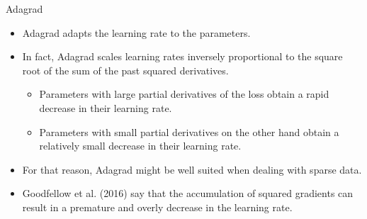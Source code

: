 \documentclass[11pt,compress,t,notes=noshow, xcolor=table]{beamer}
\begin{document}
\begin{vbframe}{Adagrad}
	\begin{itemize}
		\item Adagrad adapts the learning rate to the parameters.
		\item In fact, Adagrad scales learning rates inversely proportional to the square root of the sum of the past squared derivatives.
		\begin{itemize}
			\item Parameters with large partial derivatives of the loss obtain a rapid decrease in their learning rate.
			\item Parameters with small partial derivatives on the other hand obtain a relatively small decrease in their learning rate.
		\end{itemize}
		\item For that reason, Adagrad might be well suited when dealing with sparse data. 
		\item Goodfellow et al. (2016) say that the accumulation of squared gradients can result in a premature and overly decrease in the learning rate.
	\end{itemize}
	
	\framebreak
	

\end{vbframe}
\end{document}
